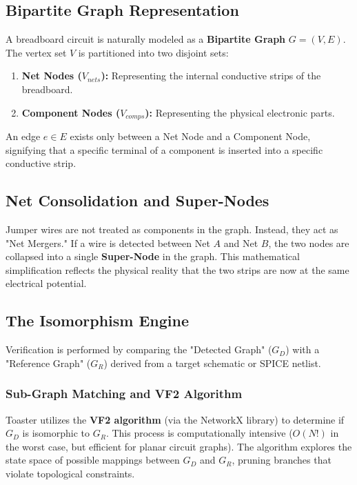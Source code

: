 \documentclass[11pt,a4paper]{article}
\begin{document}
\subsection{Bipartite Graph Representation}
A breadboard circuit is naturally modeled as a \textbf{Bipartite Graph} $G = (V, E)$. The vertex set $V$ is partitioned into two disjoint sets:
\begin{enumerate}
    \item \textbf{Net Nodes ($V_{nets}$):} Representing the internal conductive strips of the breadboard.
    \item \textbf{Component Nodes ($V_{comps}$):} Representing the physical electronic parts.
\end{enumerate}
An edge $e \in E$ exists only between a Net Node and a Component Node, signifying that a specific terminal of a component is inserted into a specific conductive strip.

\subsection{Net Consolidation and Super-Nodes}
Jumper wires are not treated as components in the graph. Instead, they act as "Net Mergers." If a wire is detected between Net $A$ and Net $B$, the two nodes are collapsed into a single \textbf{Super-Node} in the graph. This mathematical simplification reflects the physical reality that the two strips are now at the same electrical potential.

\subsection{The Isomorphism Engine}
Verification is performed by comparing the "Detected Graph" ($G_D$) with a "Reference Graph" ($G_R$) derived from a target schematic or SPICE netlist.

\subsubsection{Sub-Graph Matching and VF2 Algorithm}
Toaster utilizes the \textbf{VF2 algorithm} (via the NetworkX library) to determine if $G_D$ is isomorphic to $G_R$. This process is computationally intensive ($O(N!)$ in the worst case, but efficient for planar circuit graphs). The algorithm explores the state space of possible mappings between $G_D$ and $G_R$, pruning branches that violate topological constraints.
\end{document}
